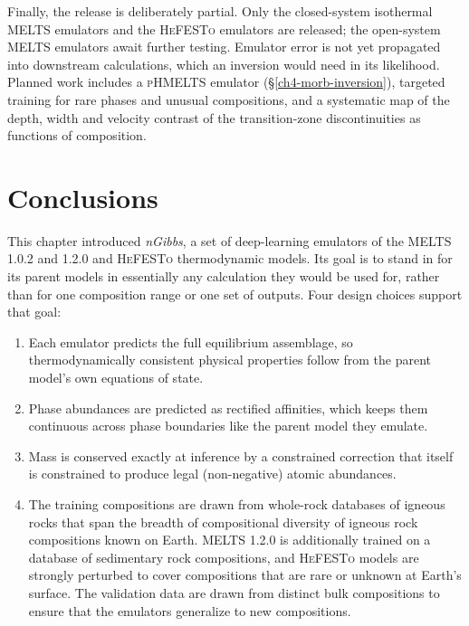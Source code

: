 Finally, the release is deliberately partial. Only the closed-system isothermal \textsc{MELTS} emulators and the \textsc{HeFESTo}
emulators are released; the open-system \textsc{MELTS} emulators await further testing. Emulator error is not yet 
propagated into downstream calculations, which an
inversion would need in its likelihood. Planned work includes a \textsc{pHMELTS} emulator (\S\ref{ch4-morb-inversion}), targeted
training for rare phases and unusual compositions, and a systematic map of the depth, width and velocity contrast of the
transition-zone discontinuities as functions of composition.

\section{Conclusions}\label{ch4-conclusions}

This chapter introduced \emph{nGibbs}, a set of deep-learning emulators of the \textsc{MELTS} 1.0.2 and 1.2.0 and \textsc{HeFESTo}
thermodynamic models. Its goal is to stand in for its parent models in essentially any calculation they would be used for, rather
than for one composition range or one set of outputs. Four design choices support that goal:
\begin{enumerate}
  \item  Each emulator predicts the full equilibrium assemblage, so thermodynamically consistent physical properties follow from the parent model's own equations of state. 
  \item  Phase abundances are predicted as rectified affinities, which keeps them continuous across phase boundaries like the parent model they emulate.
  \item  Mass is conserved exactly at inference by a constrained correction that itself is constrained to produce legal (non-negative) atomic abundances.
  \item  The training compositions are drawn from whole-rock databases of igneous rocks that span the breadth of compositional diversity of igneous rock compositions known on Earth. 
\textsc{MELTS} 1.2.0 is additionally trained on a database of sedimentary rock compositions, and \textsc{HeFESTo} models are strongly perturbed to cover compositions that are rare or unknown 
at Earth's surface. The validation data are drawn from distinct bulk compositions to ensure that the emulators generalize to new compositions.
\end{enumerate}

